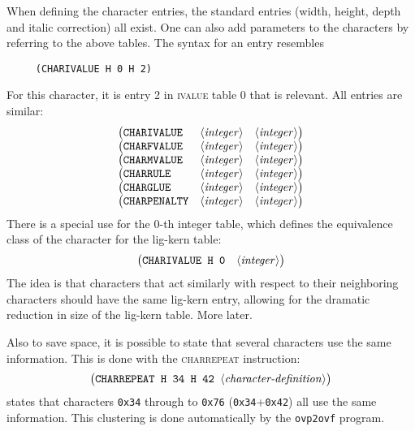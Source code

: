 \documentclass[fleqn]{article}
\newcommand{\showinteger}{\langle\mbox{\emph{integer}}\rangle}
\newcommand{\showchardefn}{\langle\mbox{\emph{character-definition}}\rangle}
\begin{document}
When defining the character entries, the standard entries (width,
height, depth and italic correction) all exist.  One can also add
parameters to the characters by referring to the above
tables.  The syntax for an entry resembles
\begin{verbatim}
     (CHARIVALUE H 0 H 2)
\end{verbatim}
For this character, it is entry 2 in \textsc{ivalue} table 0 that is
relevant.  All entries are similar:
\[
\begin{array}{lll}
     \bigl(\texttt{CHARIVALUE}  & \showinteger & \showinteger\bigr)\\
     \bigl(\texttt{CHARFVALUE}  & \showinteger & \showinteger\bigr)\\
     \bigl(\texttt{CHARMVALUE}  & \showinteger & \showinteger\bigr)\\
     \bigl(\texttt{CHARRULE}    & \showinteger & \showinteger\bigr)\\
     \bigl(\texttt{CHARGLUE}    & \showinteger & \showinteger\bigr)\\
     \bigl(\texttt{CHARPENALTY} & \showinteger & \showinteger\bigr)\\
\end{array}
\]
There is a special use for the 0-th integer table, which defines
the equivalence class of the character for the lig-kern table:
\[
\begin{array}{ll}
     \bigl(\texttt{CHARIVALUE H 0} & \showinteger\bigr)
\end{array}
\]
The idea is that characters that act similarly with respect to
their neighboring characters should have the same lig-kern
entry, allowing for the dramatic reduction in size of the
lig-kern table.  More later.

Also to save space, it is possible to state that several characters use the
same information.  This is done with the \textsc{charrepeat}
instruction:
\[
\begin{array}{ll}
     \bigl(\texttt{CHARREPEAT H 34 H 42 } \showchardefn\bigr)
\end{array}
\]
states that characters \texttt{0x34} through to \texttt{0x76}
(\texttt{0x34}+\texttt{0x42}) all use the same information.
This clustering is done automatically by the \texttt{ovp2ovf} program.
\end{document}

